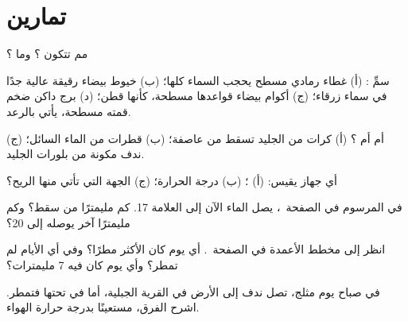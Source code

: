 \section{تمارين}

\begin{exercise}[$\star$]\label{exo:g4:clouds-rain-snow:1}
مم تتكون ؟ وما ؟
\end{exercise}

\begin{exercise}[$\star$]\label{exo:g4:clouds-rain-snow:2}
سمِّ : (أ) غطاء رمادي مسطح يحجب السماء كلها؛ (ب) خيوط بيضاء رقيقة
عالية جدًا في سماء زرقاء؛ (ج) أكوام بيضاء قواعدها مسطحة، كأنها
قطن؛ (د) برج داكن ضخم قمته مسطحة، يأتي بالرعد.
\end{exercise}

\begin{exercise}[$\star$]\label{exo:g4:clouds-rain-snow:3}
 أم  أم ؟ (أ) كرات من الجليد تسقط من  عاصفة؛ (ب) قطرات
من الماء السائل؛ (ج) ندف مكونة من بلورات الجليد.
\end{exercise}

\begin{exercise}[$\star$]\label{exo:g4:clouds-rain-snow:4}
أي جهاز يقيس: (أ) ؛ (ب) درجة الحرارة؛ (ج) الجهة التي تأتي منها
الريح؟
\end{exercise}

\begin{exercise}[$\star$]\label{exo:g4:clouds-rain-snow:5}
في  المرسوم في الصفحة~\pageref{fig:g4:clouds-rain-snow:gauge}، يصل الماء
الآن إلى العلامة 17. كم مليمترًا من  سقط؟ وكم مليمترًا
آخر يوصله إلى 20؟
\end{exercise}

\begin{exercise}[$\star$]\label{exo:g4:clouds-rain-snow:6}
انظر إلى مخطط الأعمدة في الصفحة~\pageref{fig:g4:clouds-rain-snow:bars}. أي يوم
كان الأكثر مطرًا؟ وفي أي الأيام لم تمطر؟ وأي يوم كان فيه 7
مليمترات؟
\end{exercise}

\begin{exercise}[$\star\star$]\label{exo:g4:clouds-rain-snow:7}
في صباح يوم مثلج، تصل ندف  إلى الأرض في القرية الجبلية، أما في
 تحتها فتمطر. اشرح الفرق،
مستعينًا بدرجة حرارة الهواء.
\end{exercise}

